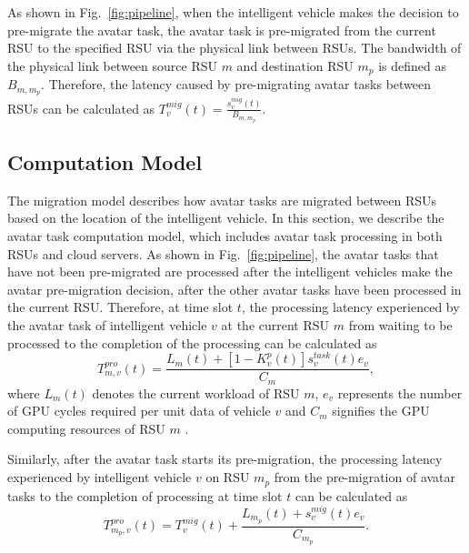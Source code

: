 \documentclass[lettersize,journal]{IEEEtran}
\begin{document}
As shown in Fig.~\ref{fig:pipeline}, when the intelligent vehicle makes the decision to pre-migrate the avatar task, the avatar task is pre-migrated from the current RSU to the specified RSU via the physical link between RSUs. The bandwidth of the physical link between source RSU $m$ and destination RSU $m_{p}$ is defined as $B_{m,m_{p}}$. Therefore, the latency caused by pre-migrating avatar tasks between RSUs can be calculated as $T^{mig}_{v}(t)=\frac{s^{mig}_v(t)}{B_{m,m_{p}}}$. 

\subsection{Computation Model}
The migration model describes how avatar tasks are migrated between RSUs based on the location of the intelligent vehicle. In this section, we describe the avatar task computation model, which includes avatar task processing in both RSUs and cloud servers. As shown in Fig.~\ref{fig:pipeline}, the avatar tasks that have not been pre-migrated are processed after the intelligent vehicles make the avatar pre-migration decision, after the other avatar tasks have been processed in the current RSU. Therefore, at time slot $t$, the processing latency experienced by the avatar task of intelligent vehicle $v$ at the current RSU $m$ from waiting to be processed to the completion of the processing can be calculated as
\begin{equation}
T^{pro}_{m,v}(t)= \frac{L_m(t) + [1-K^p_v(t)] s^{task}_v(t) e_v}{C_m},\label{eq7}
\end{equation}
where $L_m(t)$ denotes the current workload of RSU $m$, $e_v$ represents the number of GPU cycles required per unit data of vehicle $v$ and $C_m$ signifies the GPU computing resources of RSU $m$ \cite{ren2020edge}.

Similarly, after the avatar task starts its pre-migration, the processing latency experienced by intelligent vehicle $v$ on RSU $m_{p}$ from the pre-migration of avatar tasks to the completion of processing at time slot $t$ can be calculated as
\begin{equation}
T^{pro}_{m_{p},v}(t)= T^{mig}_v(t) + \frac{L_{m_{p}}(t) + s^{mig}_v(t) e_v}{C_{m_{p}}}.\label{eq8}
\end{equation}
\end{document}
